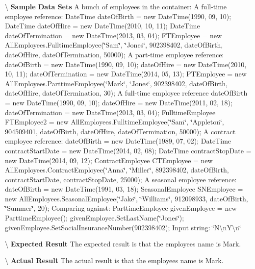 \textbackslash{} {\bfseries  Sample Data Sets} A bunch of employees in the container\+: A full-\/time employee reference\+: Date\+Time date\+Of\+Birth = new Date\+Time(1990, 09, 10); Date\+Time date\+Of\+Hire = new Date\+Time(2010, 10, 11); Date\+Time date\+Of\+Termination = new Date\+Time(2013, 03, 04); F\+T\+Employee = new All\+Employees.\+Fulltime\+Employee(\char`\"{}\+Sam\char`\"{}, \char`\"{}\+Jones\char`\"{}, 902398402, date\+Of\+Birth, date\+Of\+Hire, date\+Of\+Termination, 50000); A part-\/time employee reference\+: date\+Of\+Birth = new Date\+Time(1990, 09, 10); date\+Of\+Hire = new Date\+Time(2010, 10, 11); date\+Of\+Termination = new Date\+Time(2014, 05, 13); P\+T\+Employee = new All\+Employees.\+Parttime\+Employee(\char`\"{}\+Mark\char`\"{}, \char`\"{}\+Jones\char`\"{}, 902398402, date\+Of\+Birth, date\+Of\+Hire, date\+Of\+Termination, 30); A full-\/time employee reference date\+Of\+Birth = new Date\+Time(1990, 09, 10); date\+Of\+Hire = new Date\+Time(2011, 02, 18); date\+Of\+Termination = new Date\+Time(2013, 03, 04); Fulltime\+Employee F\+T\+Employee2 = new All\+Employees.\+Fulltime\+Employee(\char`\"{}\+Sam\char`\"{}, \char`\"{}\+Appleton\char`\"{}, 904509401, date\+Of\+Birth, date\+Of\+Hire, date\+Of\+Termination, 50000); A contract employee reference\+: date\+Of\+Birth = new Date\+Time(1989, 07, 02); Date\+Time contract\+Start\+Date = new Date\+Time(2014, 02, 08); Date\+Time contract\+Stop\+Date = new Date\+Time(2014, 09, 12); Contract\+Employee C\+T\+Employee = new All\+Employees.\+Contract\+Employee(\char`\"{}\+Anna\char`\"{}, \char`\"{}\+Miller\char`\"{}, 892398402, date\+Of\+Birth, contract\+Start\+Date, contract\+Stop\+Date, 25000); A seasonal employee reference\+: date\+Of\+Birth = new Date\+Time(1991, 03, 18); Seasonal\+Employee S\+N\+Employee = new All\+Employees.\+Seasonal\+Employee(\char`\"{}\+Jake\char`\"{}, \char`\"{}\+Williams\char`\"{}, 912098933, date\+Of\+Birth, \char`\"{}\+Summer\char`\"{}, 20); Comparing against\+: Parttime\+Employee given\+Employee = new Parttime\+Employee(); given\+Employee.\+Set\+Last\+Name(\char`\"{}\+Jones\char`\"{}); given\+Employee.\+Set\+Social\+Insurance\+Number(902398402); Input string\+: \char`\"{}\+N\textbackslash{}n\+Y\textbackslash{}n\char`\"{}

\textbackslash{} {\bfseries  Expected Result} The expected result is that the employee\textquotesingle{}s name is Mark.

\textbackslash{} {\bfseries  Actual Result} The actual result is that the employee\textquotesingle{}s name is Mark. \hypertarget{class_the_company_1_1_tests_1_1_select_employee_tests_a26ebfea9f96e8491fdcf2ae26e58ffaf}{}

